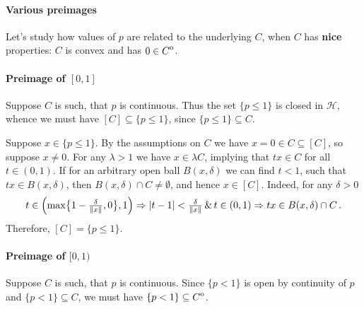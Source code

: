 \documentclass[a4paper]{article}
\newcommand{\Hcal}{\mathcal{H}}
\newcommand{\interior}[1]{%
  {\kern0pt#1}^{\mathrm{o}}%
}
\begin{document}

\paragraph{Various preimages} %
\label{par:various_preimages}

Let's study how values of $p$ are related to the underlying $C$, when $C$ has {\bf
nice} properties: $C$ is convex and has $0\in \interior{C}$.


\paragraph{Preimage of $[0, 1]$} %
\label{par:preimage_of_0_1_closed}

Suppose $C$ is such, that $p$ is continuous. Thus the set $\{p\leq 1\}$ is closed in
$\Hcal$, whence we must have $[C] \subseteq \{p\leq 1\}$, since $\{p\leq 1\} \subseteq
C$.

Suppose $x\in \{p\leq 1\}$. By the assumptions on $C$ we have $x = 0 \in C \subseteq [C]$,
so suppose $x\neq 0$. For any $\lambda > 1$ we have $x\in \lambda C$, implying that
$t x \in C$ for all $t \in (0, 1)$. If for an arbitrary open ball $B(x, \delta)$ we
can find $t < 1$, such that $t x \in B(x, \delta)$, then $B(x, \delta) \cap C \neq
\emptyset$, and hence $x \in [C]$. Indeed, for any $\delta > 0$
\begin{equation*}
  t \in\Bigl(
    \max\bigl\{1 - \tfrac\delta{\|x\|}, 0\bigr\}, 1
  \Bigr)
    \Rightarrow
      \lvert t - 1\rvert < \tfrac\delta{\|x\|}
      \, \& \, t \in (0, 1)
    \Rightarrow
      t x \in B(x, \delta) \cap C
      \,.
\end{equation*}
Therefore, $[C] = \{p \leq 1\}$.


\paragraph{Preimage of $[0, 1)$} %
\label{par:preimage_of_0_1_open}

Suppose $C$ is such, that $p$ is continuous. Since $\{p < 1\}$ is open by continuity
of $p$ and $\{p < 1\} \subseteq C$, we must have $\{p < 1\} \subseteq \interior{C}$.
\end{document}

